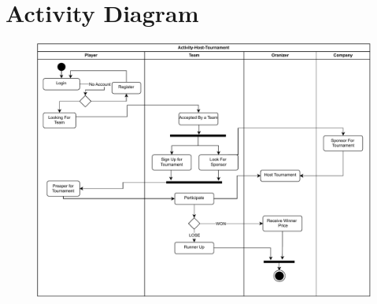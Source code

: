 \clearpage

\section{Activity Diagram}

\begin{figure}[h]
    \centering
    \vspace{3cm}
    \includegraphics[width=1\textwidth]{diagrams/Diagram-Activity-Host.drawio.pdf}
    \label{fig:Activity Diagram}
\end{figure}

\clearpage

